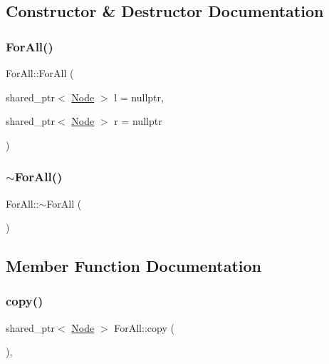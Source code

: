 \subsection{Constructor \& Destructor Documentation}
\mbox{\label{class_for_all_a2f654f00f8d997a89699dff8f1efd759}} 
\subsubsection{\texorpdfstring{For\+All()}{ForAll()}}
{\footnotesize\ttfamily For\+All\+::\+For\+All (\begin{DoxyParamCaption}\item[{shared\+\_\+ptr$<$ \hyperlink{class_node}{Node} $>$}]{l = {\ttfamily nullptr},  }\item[{shared\+\_\+ptr$<$ \hyperlink{class_node}{Node} $>$}]{r = {\ttfamily nullptr} }\end{DoxyParamCaption})}

\mbox{\label{class_for_all_a0c63e42814329a95378fe95f41a369fa}} 
\subsubsection{\texorpdfstring{$\sim$\+For\+All()}{~ForAll()}}
{\footnotesize\ttfamily For\+All\+::$\sim$\+For\+All (\begin{DoxyParamCaption}{ }\end{DoxyParamCaption})\hspace{0.3cm}{\ttfamily [override]}}



\subsection{Member Function Documentation}
\mbox{\label{class_for_all_ae9b3918a9cd0870a20b80db2288fe402}} 
\subsubsection{\texorpdfstring{copy()}{copy()}}
{\footnotesize\ttfamily shared\+\_\+ptr$<$ \hyperlink{class_node}{Node} $>$ For\+All\+::copy (\begin{DoxyParamCaption}{ }\end{DoxyParamCaption})\hspace{0.3cm}{\ttfamily [override]}, {\ttfamily [virtual]}}



